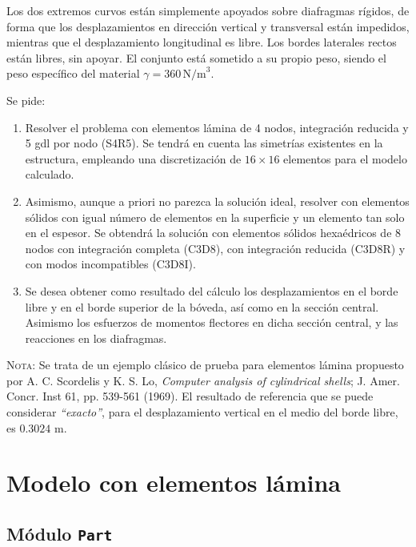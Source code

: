 \documentclass[spanish,a4paper,12pt]{article}
\begin{document}
Los dos extremos curvos están simplemente apoyados sobre diafragmas rígidos, de forma que los desplazamientos en dirección vertical y transversal están impedidos, mientras que el desplazamiento longitudinal es libre. 
Los bordes laterales rectos están libres, sin apoyar.
El conjunto está sometido a su propio peso, siendo el peso específico del material $\gamma=360\,\text{N/m}^{3}$.

Se pide:
\begin{enumerate}
\item
Resolver el problema con elementos lámina de 4 nodos, integración reducida y 5 gdl por nodo (S4R5).
Se tendrá en cuenta las simetrías existentes en la estructura, empleando una discretización de $16\times 16$ elementos para el modelo calculado. 
\item
Asimismo, aunque a priori no parezca la solución ideal, resolver con elementos sólidos con igual número de elementos en la superficie y un elemento tan solo en el espesor. 
Se obtendrá la solución con elementos sólidos hexaédricos de 8 nodos con integración completa (C3D8), con integración reducida (C3D8R) y con modos incompatibles (C3D8I).
\item
Se desea obtener como resultado del cálculo los desplazamientos en el borde libre y en el borde superior de la bóveda, así como en la sección central. 
Asimismo los esfuerzos de momentos flectores en dicha sección central, y las reacciones en los diafragmas.
\end{enumerate}

\textsc{Nota:} Se trata de un ejemplo clásico de prueba para elementos lámina propuesto por A. C. Scordelis y K. S. Lo, \emph{Computer analysis of cylindrical shells}; J. Amer. Concr. Inst 61, pp. 539-561 (1969).
El resultado de referencia que se puede considerar \emph{``exacto''}, para el desplazamiento vertical en el medio del borde libre, es $0.3024$ m.


\section{Modelo con elementos lámina}
\label{sec:guia}

\subsection{Módulo \texttt{Part}}
\end{document}
